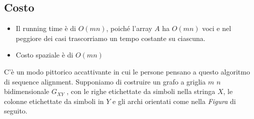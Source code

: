 \subsection{Costo}

\begin{itemize}
  \item
        Il running time è di $O(mn)$, poiché l'array $A$ ha $O(mn)$ voci
        e nel peggiore dei casi trascorriamo un tempo costante su ciascuna.
  \item
        Costo spaziale è di $O(mn)$
\end{itemize}

C'è un modo pittorico accattivante in cui le persone pensano a questo
algoritmo di sequence alignment. Supponiamo di costruire un grafo a
griglia $m$ \times $n$ bidimensionale $G_{XY}$ , con le righe
etichettate da simboli nella stringa $X$, le colonne etichettate da
simboli in $Y$ e gli archi orientati come nella \emph{Figura} di
seguito.

